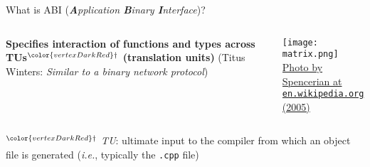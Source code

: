 \begin{frame}{What is ABI (\textit{\textbf{A}pplication \textbf{B}inary \textbf{I}nterface})?}
    \begin{columns}
        \begin{column}{.6\textwidth}
            \textbf{Specifies interaction of functions and types across TUs${}^{\color{vertexDarkRed}\dagger}$ (translation units)}
            (Titus Winters: \textit{Similar to a binary network protocol})
        \end{column}
        \begin{column}{.3\textwidth}
            \centering
            \texttt{[image: matrix.png]}\\
            {\footnotesize \href{https://commons.wikimedia.org/wiki/File:Spencerian_Matrix_cosplay.jpg}{Photo by Spencerian at \texttt{en.wikipedia.org} (2005)}}
        \end{column}
    \end{columns}

    \vspace{5mm}

    \footnotesize ${}^{\color{vertexDarkRed}\dagger}$ \textit{TU}: ultimate input to the compiler from which an object file is generated (\textit{i.e.}, typically the \texttt{.cpp} file)
\end{frame}

